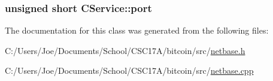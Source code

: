 \subsubsection[{port}]{\setlength{\rightskip}{0pt plus 5cm}unsigned short C\+Service\+::port\hspace{0.3cm}{\ttfamily [protected]}}\label{class_c_service_aef17734203dc2125cbdf4d23e50be410}


The documentation for this class was generated from the following files\+:\begin{DoxyCompactItemize}
\item 
C\+:/\+Users/\+Joe/\+Documents/\+School/\+C\+S\+C17\+A/bitcoin/src/\hyperlink{netbase_8h}{netbase.\+h}\item 
C\+:/\+Users/\+Joe/\+Documents/\+School/\+C\+S\+C17\+A/bitcoin/src/\hyperlink{netbase_8cpp}{netbase.\+cpp}\end{DoxyCompactItemize}
